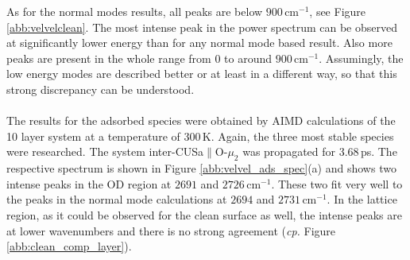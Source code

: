 \documentclass[11pt,DIV=13,BCOR=5mm,a4paper,headinclude]{scrbook}
\begin{document}
As for the normal modes results, all peaks are below $900\,$cm$^{-1}$, see Figure \ref{abb:velvelclean}.
The most intense peak in the power spectrum can be observed at significantly lower energy than for any normal mode based result.
Also more peaks are present in the whole range from $0$ to around $900\,$cm$^{-1}$.
Assumingly, the low energy modes are described better or at least in a different way, so that this strong discrepancy can be understood.
\\\\
The results for the adsorbed species were obtained by AIMD calculations of the 10 layer system at a temperature of $300\,$K.
Again, the three most stable species were researched.
The system inter-CUSa$\parallel$O-$\mu_2$ was propagated for $3.68\,$ps.
The respective spectrum is shown in Figure \ref{abb:velvel_ads_spec}(a) and shows two intense peaks in the OD region at $2691$ and $2726\,$cm$^{-1}$.
These two fit very well to the peaks in the normal mode calculations at $2694$ and $2731\,$cm$^{-1}$.
In the lattice region, as it could be observed for the clean surface as well, the intense peaks are at lower wavenumbers and there is no strong agreement (\textit{cp.} Figure \ref{abb:clean_comp_layer}).
\end{document}
